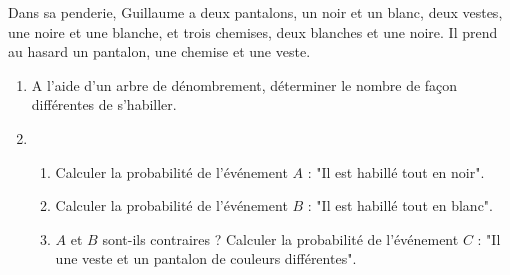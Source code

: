 
Dans sa penderie, Guillaume a deux pantalons, un noir et un blanc, deux vestes, une noire et une blanche, et trois chemises, deux blanches et une noire. Il prend au hasard un pantalon, une chemise et une veste.
\begin{enumerate}
\item A l'aide d'un arbre de dénombrement, déterminer le nombre de façon différentes de s'habiller.
\item
\begin{enumerate}
\item Calculer la probabilité de l'événement $A$ : "Il est habillé tout en noir".
\item Calculer la probabilité de l'événement $B$ : "Il est habillé tout en blanc".
\item $A$ et $B$ sont-ils contraires ?
Calculer la probabilité de l'événement $C$ : "Il une veste et un pantalon de couleurs différentes".
\end{enumerate}
\end{enumerate}
